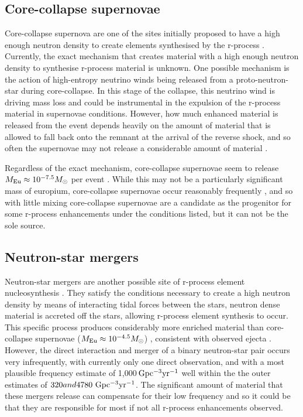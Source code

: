 \documentclass[a4paper,fleqn,usenatbib]{mnras}
\begin{document}
	\subsection{Core-collapse supernovae}
	Core-collapse supernova are one of the sites initially proposed to have a high enough neutron density to create elements synthesised by the r-process \citep{Burbidge1957}. Currently, the exact  mechanism that creates material with a high enough neutron density to synthesise r-process material is unknown.
	One possible mechanism is the action of high-entropy neutrino winds being released from a proto-neutron-star during core-collapse. In this stage of the collapse, this neutrino wind is driving mass loss and could be instrumental in the expulsion of the r-process material in supernovae conditions. However, how much enhanced material is released from the event depends heavily on the amount of material that is allowed to fall back onto the remnant at the arrival of the reverse shock, and so often the supernovae may not release a considerable amount of material \citep{Woosley1992, Burrows1995}. 
	
	Regardless of the exact mechanism, core-collapse supernovae seem to release $M_{\rm{Eu}}\approx10^{-7.5} M_{\odot}$ per event \citep{Argast2004}. While this may not be a particularly significant mass of europium, core-collapse supernovae occur reasonably frequently \citep[44,700$\,\ \rm{Gpc}^{-3} \rm{yr^{-1}}$;][]{Li2011}, and so with little mixing core-collapse supernovae are a candidate as the progenitor for some r-process enhancements under the conditions listed, but it can not be the sole source.
	
	\subsection{Neutron-star mergers}
	\label{NSmerg}
	Neutron-star mergers are another possible site of r-process element nucleosynthesis \citep{Kasen2017,Hotok2013,Drout2017}. They satisfy the conditions necessary to create a high neutron density by means of interacting tidal forces between the stars, neutron dense material is accreted off the stars, allowing r-process element synthesis to occur. This specific process produces considerably more enriched material than core-collapse supernovae ($M_{\rm{Eu}}\approx10^{-4.5} M_{\odot}$) \citep{Goriely2011}, consistent with observed ejecta \citep{Kasliwal2017}. However, the direct interaction and merger of a binary neutron-star pair occurs very infrequently, with currently only one direct observation, and with a most plausible frequency estimate of 1,000$\,\rm{Gpc^{-3}yr^{-1}}$ \citep{LIGO2016,Abadie2010} well within the the outer estimates of $320 and 4780\ \rm{Gpc^{-3}yr^{-1}}$. The significant amount of material that these mergers release can compensate for their low frequency and so it could be that they are responsible for most if not all r-process enhancements observed.
\end{document}
